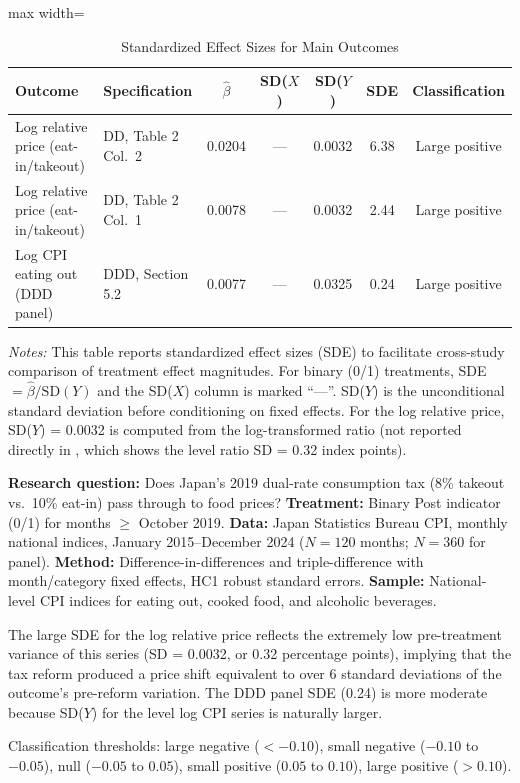 \documentclass[12pt]{article}
\begin{document}
\begin{table}[H]
\centering
\caption{Standardized Effect Sizes for Main Outcomes}
\label{tab:sde}
\begin{adjustbox}{max width=\textwidth}
\begin{tabular}{llccccc}
\toprule
Outcome & Specification & $\hat{\beta}$ & SD($X$) & SD($Y$) & SDE & Classification \\
\midrule
Log relative price (eat-in/takeout) & DD, Table 2 Col.\ 2 & 0.0204 & --- & 0.0032 & 6.38 & Large positive \\
Log relative price (eat-in/takeout) & DD, Table 2 Col.\ 1 & 0.0078 & --- & 0.0032 & 2.44 & Large positive \\
Log CPI eating out (DDD panel) & DDD, Section 5.2 & 0.0077 & --- & 0.0325 & 0.24 & Large positive \\
\bottomrule
\end{tabular}
\end{adjustbox}
\par\vspace{0.3em}
{\footnotesize \emph{Notes:} This table reports standardized effect sizes (SDE)
to facilitate cross-study comparison of treatment effect magnitudes.
For binary (0/1) treatments, SDE $= \hat{\beta} / \text{SD}(Y)$ and the SD($X$)
column is marked ``---''.
SD($Y$) is the unconditional standard deviation before conditioning on fixed effects.
For the log relative price, SD($Y$) = 0.0032 is computed from the log-transformed ratio (not reported directly in , which shows the level ratio SD = 0.32 index points).

\textbf{Research question:} Does Japan's 2019 dual-rate consumption tax (8\% takeout vs.\ 10\% eat-in) pass through to food prices?
\textbf{Treatment:} Binary Post indicator (0/1) for months $\geq$ October 2019.
\textbf{Data:} Japan Statistics Bureau CPI, monthly national indices, January 2015--December 2024 ($N = 120$ months; $N = 360$ for panel).
\textbf{Method:} Difference-in-differences and triple-difference with month/category fixed effects, HC1 robust standard errors.
\textbf{Sample:} National-level CPI indices for eating out, cooked food, and alcoholic beverages.

The large SDE for the log relative price reflects the extremely low pre-treatment variance of this series (SD = 0.0032, or 0.32 percentage points), implying that the tax reform produced a price shift equivalent to over 6 standard deviations of the outcome's pre-reform variation. The DDD panel SDE (0.24) is more moderate because SD($Y$) for the level log CPI series is naturally larger.

Classification thresholds:
large negative ($< -0.10$), small negative ($-0.10$ to $-0.05$),
null ($-0.05$ to $0.05$), small positive ($0.05$ to $0.10$),
large positive ($> 0.10$).}
\end{table}
\end{document}
